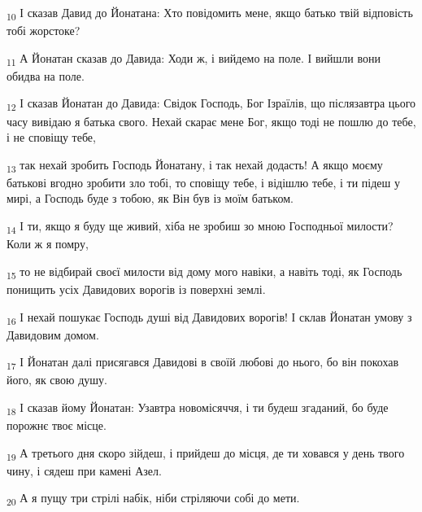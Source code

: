 \begin{tcolorbox}
\textsubscript{10} І сказав Давид до Йонатана: Хто повідомить мене, якщо батько твій відповість тобі жорстоке?
\end{tcolorbox}
\begin{tcolorbox}
\textsubscript{11} А Йонатан сказав до Давида: Ходи ж, і вийдемо на поле. І вийшли вони обидва на поле.
\end{tcolorbox}
\begin{tcolorbox}
\textsubscript{12} І сказав Йонатан до Давида: Свідок Господь, Бог Ізраїлів, що післязавтра цього часу вивідаю я батька свого. Нехай скарає мене Бог, якщо тоді не пошлю до тебе, і не сповіщу тебе,
\end{tcolorbox}
\begin{tcolorbox}
\textsubscript{13} так нехай зробить Господь Йонатану, і так нехай додасть! А якщо моєму батькові вгодно зробити зло тобі, то сповіщу тебе, і відішлю тебе, і ти підеш у мирі, а Господь буде з тобою, як Він був із моїм батьком.
\end{tcolorbox}
\begin{tcolorbox}
\textsubscript{14} І ти, якщо я буду ще живий, хіба не зробиш зо мною Господньої милости? Коли ж я помру,
\end{tcolorbox}
\begin{tcolorbox}
\textsubscript{15} то не відбирай своєї милости від дому мого навіки, а навіть тоді, як Господь понищить усіх Давидових ворогів із поверхні землі.
\end{tcolorbox}
\begin{tcolorbox}
\textsubscript{16} І нехай пошукає Господь душі від Давидових ворогів! І склав Йонатан умову з Давидовим домом.
\end{tcolorbox}
\begin{tcolorbox}
\textsubscript{17} І Йонатан далі присягався Давидові в своїй любові до нього, бо він покохав його, як свою душу.
\end{tcolorbox}
\begin{tcolorbox}
\textsubscript{18} І сказав йому Йонатан: Узавтра новомісяччя, і ти будеш згаданий, бо буде порожнє твоє місце.
\end{tcolorbox}
\begin{tcolorbox}
\textsubscript{19} А третього дня скоро зійдеш, і прийдеш до місця, де ти ховався у день твого чину, і сядеш при камені Азел.
\end{tcolorbox}
\begin{tcolorbox}
\textsubscript{20} А я пущу три стрілі набік, ніби стріляючи собі до мети.
\end{tcolorbox}
